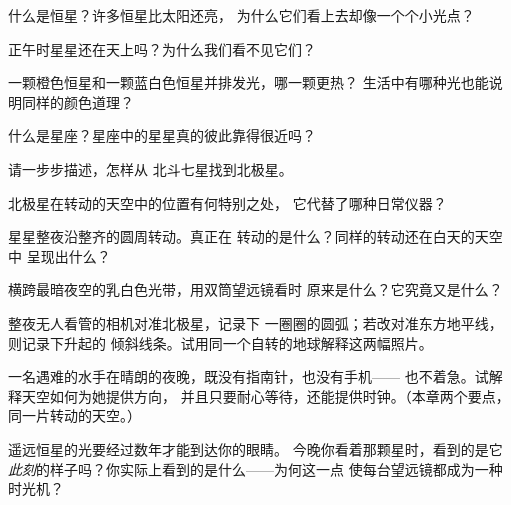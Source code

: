 \begin{exercise}[$\star$]\label{exo:g5:stars-night-sky:1}
什么是恒星？许多恒星比太阳还亮，
为什么它们看上去却像一个个小光点？
\end{exercise}

\begin{exercise}[$\star$]\label{exo:g5:stars-night-sky:2}
正午时星星还在天上吗？为什么我们看不见它们？
\end{exercise}

\begin{exercise}[$\star$]\label{exo:g5:stars-night-sky:3}
一颗橙色恒星和一颗蓝白色恒星并排发光，哪一颗更热？
生活中有哪种光也能说明同样的颜色道理？
\end{exercise}

\begin{exercise}[$\star$]\label{exo:g5:stars-night-sky:4}
什么是星座？星座中的星星真的彼此靠得很近吗？
\end{exercise}

\begin{exercise}[$\star$]\label{exo:g5:stars-night-sky:5}
请一步步描述，怎样从
北斗七星找到北极星。
\end{exercise}

\begin{exercise}[$\star$]\label{exo:g5:stars-night-sky:6}
北极星在转动的天空中的位置有何特别之处，
它代替了哪种日常仪器？
\end{exercise}

\begin{exercise}[$\star$]\label{exo:g5:stars-night-sky:7}
星星整夜沿整齐的圆周转动。真正在
转动的是什么？同样的转动还在白天的天空中
呈现出什么？
\end{exercise}

\begin{exercise}[$\star$]\label{exo:g5:stars-night-sky:8}
横跨最暗夜空的乳白色光带，用双筒望远镜看时
原来是什么？它究竟又是什么？
\end{exercise}

\begin{exercise}[$\star\star$]\label{exo:g5:stars-night-sky:9}
整夜无人看管的相机对准北极星，记录下
一圈圈的圆弧；若改对准东方地平线，则记录下升起的
倾斜线条。试用同一个自转的地球解释这两幅照片。
\end{exercise}

\begin{exercise}[$\star\star$]\label{exo:g5:stars-night-sky:10}
一名遇难的水手在晴朗的夜晚，既没有指南针，也没有手机——
也不着急。试解释天空如何为她提供方向，
并且只要耐心等待，还能提供时钟。（本章两个要点，同一片转动的天空。）
\end{exercise}

\begin{exercise}[$\star\star$]\label{exo:g5:stars-night-sky:11}
遥远恒星的光要经过数年才能到达你的眼睛。
今晚你看着那颗星时，看到的是它
\emph{此刻}的样子吗？你实际上看到的是什么——为何这一点
使每台望远镜都成为一种时光机？
\end{exercise}
